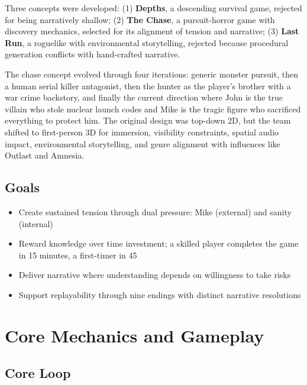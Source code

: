 \documentclass[12pt, letterpaper]{article}
\begin{document}
Three concepts were developed: (1) \textbf{Depths}, a descending survival game, rejected for being narratively shallow; (2) \textbf{The Chase}, a pursuit-horror game with discovery mechanics, selected for its alignment of tension and narrative; (3) \textbf{Last Run}, a roguelike with environmental storytelling, rejected because procedural generation conflicts with hand-crafted narrative.

The chase concept evolved through four iterations: generic monster pursuit, then a human serial killer antagonist, then the hunter as the player's brother with a war crime backstory, and finally the current direction where John is the true villain who stole nuclear launch codes and Mike is the tragic figure who sacrificed everything to protect him. The original design was top-down 2D, but the team shifted to first-person 3D for immersion, visibility constraints, spatial audio impact, environmental storytelling, and genre alignment with influences like Outlast and Amnesia.

\subsection{Goals}

\begin{itemize}[leftmargin=2em, topsep=0pt, itemsep=2pt]
    \item Create sustained tension through dual pressure: Mike (external) and sanity (internal)
    \item Reward knowledge over time investment; a skilled player completes the game in 15 minutes, a first-timer in 45
    \item Deliver narrative where understanding depends on willingness to take risks
    \item Support replayability through nine endings with distinct narrative resolutions
\end{itemize}

\section{Core Mechanics and Gameplay}

\subsection{Core Loop}
\end{document}
